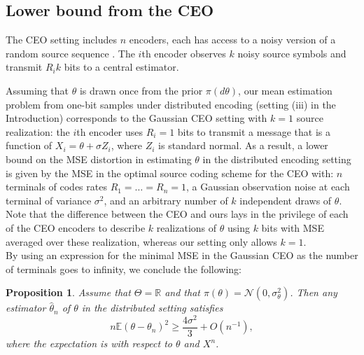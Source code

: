 \documentclass[letterpaper, conference, 11pt]{IEEEtran}      %
\newtheorem{prop}[thm]{\bf {Proposition}}
\begin{document}
\subsection{Lower bound from the CEO \label{sec:ceo}}
The CEO setting includes $n$ encoders, each has access to a noisy version of a random source sequence \cite{berger1996ceo}. 
The $i$th encoder observes $k$ noisy source symbols and transmit $R_i k$ bits to a central estimator. \par
Assuming that $\theta$ is drawn once from the prior $\pi(d\theta)$, our mean estimation problem from one-bit samples under distributed encoding (setting (iii) in the Introduction) corresponds to the Gaussian CEO setting with $k=1$ source realization: the $i$th encoder uses $R_i=1$ bits to transmit a message that is a function of $X_i = \theta + \sigma Z_i$, where $Z_i$ is standard normal. As a result, a lower bound on the MSE distortion in estimating $\theta$ in the distributed encoding setting is given by the MSE in the optimal source coding scheme for the CEO with: $n$ terminals of codes rates $R_1 = \ldots = R_n = 1$, a Gaussian observation noise at each terminal of variance $\sigma^2$, and an arbitrary number of $k$ independent draws of $\theta$. Note that the difference between the CEO and ours lays in the privilege of each of the CEO encoders to describe $k$ realizations of $\theta$ using $k$ bits with MSE averaged over these realization, whereas our setting only allows $k=1$. 
 \\

By using an expression for the minimal MSE in the Gaussian CEO as the number of terminals goes to infinity, we conclude the following:
\begin{prop} \label{prop:ceo_lower_bound}
Assume that $\Theta = \mathbb R$ and that $\pi(\theta) = \mathcal N(0,\sigma_\theta^2)$. Then any estimator $\hat{\theta}_n$ of $\theta$ in the distributed setting satisfies
\begin{equation} \label{eq:ceo_bound}
 n\mathbb E \left( \theta - \theta_n \right)^2 \geq \frac{4\sigma^2}{3} + O(n^{-1}),
\end{equation}
where the expectation is with respect to $\theta$ and $X^n$.
\end{prop}
\end{document}

